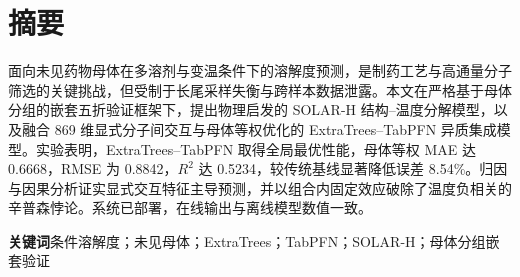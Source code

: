 \section*{摘要}
面向未见药物母体在多溶剂与变温条件下的溶解度预测，是制药工艺与高通量分子筛选的关键挑战，但受制于长尾采样失衡与跨样本数据泄露。本文在严格基于母体分组的嵌套五折验证框架下，提出物理启发的 SOLAR-H 结构--温度分解模型，以及融合 869 维显式分子间交互与母体等权优化的 ExtraTrees--TabPFN 异质集成模型。实验表明，ExtraTrees--TabPFN 取得全局最优性能，母体等权 MAE 达 0.6668，RMSE 为 0.8842，$R^2$ 达 0.5234，较传统基线显著降低误差 8.54\%。归因与因果分析证实显式交互特征主导预测，并以组合内固定效应破除了温度负相关的辛普森悖论。系统已部署，在线输出与离线模型数值一致。

\noindent\textbf{关键词}\quad 条件溶解度；未见母体；ExtraTrees；TabPFN；SOLAR-H；母体分组嵌套验证